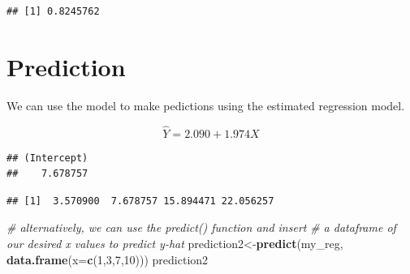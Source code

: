 \documentclass[]{book}
\newenvironment{Shaded}{\begin{snugshade}}{\end{snugshade}}
\newcommand{\KeywordTok}[1]{\textcolor[rgb]{0.13,0.29,0.53}{\textbf{#1}}}
\newcommand{\DataTypeTok}[1]{\textcolor[rgb]{0.13,0.29,0.53}{#1}}
\newcommand{\DecValTok}[1]{\textcolor[rgb]{0.00,0.00,0.81}{#1}}
\newcommand{\CommentTok}[1]{\textcolor[rgb]{0.56,0.35,0.01}{\textit{#1}}}
\newcommand{\OperatorTok}[1]{\textcolor[rgb]{0.81,0.36,0.00}{\textbf{#1}}}
\newcommand{\NormalTok}[1]{#1}
\theoremstyle{definition}
\theoremstyle{definition}
\theoremstyle{definition}
\theoremstyle{remark}
\begin{document}
\begin{verbatim}
## [1] 0.8245762
\end{verbatim}

\section{Prediction}\label{prediction}

We can use the model to make pedictions using the estimated regression
model.

\[\hat{Y}=2.090+1.974X\]

\begin{Shaded}
\end{Shaded}

\begin{verbatim}
## (Intercept) 
##    7.678757
\end{verbatim}

\begin{Shaded}
\end{Shaded}

\begin{verbatim}
## [1]  3.570900  7.678757 15.894471 22.056257
\end{verbatim}

\begin{Shaded}
\begin{Highlighting}[]
\CommentTok{# alternatively, we can use the predict() function and insert }
\CommentTok{# a dataframe of our desired x values to predict y-hat}
\NormalTok{prediction2<-}\KeywordTok{predict}\NormalTok{(my_reg, }\KeywordTok{data.frame}\NormalTok{(}\DataTypeTok{x=}\KeywordTok{c}\NormalTok{(}\DecValTok{1}\NormalTok{,}\DecValTok{3}\NormalTok{,}\DecValTok{7}\NormalTok{,}\DecValTok{10}\NormalTok{)))}
\NormalTok{prediction2}
\end{Highlighting}
\end{Shaded}
\end{document}
